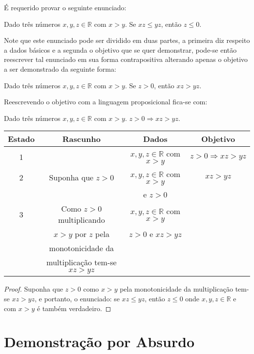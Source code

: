 \begin{exem}\label{exe:DemonstracaoImplicacao5}
	É requerido provar o seguinte enunciado:
	\begin{center}
		Dado três números $x, y, z \in \mathbb{R}$ com $x > y$. Se $xz \leq yz$, então $z \leq 0$.
	\end{center}
	Note que este enunciado pode ser dividido em duas partes, a primeira diz respeito a dados básicos e a segunda o objetivo que se quer demonstrar, pode-se então reescrever tal enunciado em sua forma contrapositiva alterando apenas o objetivo a ser demonstrado da seguinte forma:
	\begin{center}
		Dado três números $x, y, z \in \mathbb{R}$ com $x > y$. Se $z > 0$, então $xz > yz$.
	\end{center}
	Reescrevendo o objetivo com a linguagem proposicional fica-se com:
	\begin{center}
		Dado três números $x, y, z \in \mathbb{R}$ com $x > y$. $z > 0 \Rightarrow xz > yz$.
	\end{center}
	\begin{table*}[h]
		\centering
		\begin{tabular}{c|c|c|c}
			\hline
			\rowcolor{cinzaClaro}
			Estado & Rascunho & Dados & Objetivo\\
			\hline
			1 & & $x, y, z \in \mathbb{R}$ com $x > y$ & $z > 0 \Rightarrow xz > yz$\\
			2 & Suponha que $z > 0$ & $x, y, z \in \mathbb{R}$ com $x > y$ & $xz > yz$\\
			& & e $z > 0$  &\\
			3 & Como $z > 0$ multiplicando& $x, y, z \in \mathbb{R}$ com $x > y$ &\\
			& $x > y$  por $z$ pela & $z > 0$ e $xz > yz$ &\\
			& monotonicidade da  & &\\
			& multiplicação tem-se $xz > yz$  & & \\
			\hline
		\end{tabular}
	\end{table*}

	\begin{proof}
		Suponha que $z > 0$ como $x > y$ pela monotonicidade da multiplicação tem-se $xz > yz$, e portanto, o enunciado: se $xz \leq yz$, então $z \leq 0$ onde $x, y, z \in \mathbb{R}$ e com $x > y$ é também verdadeiro.
	\end{proof}
\end{exem}

\section{Demonstração por Absurdo}\label{sec:DemonstracaoAbsurdo}

